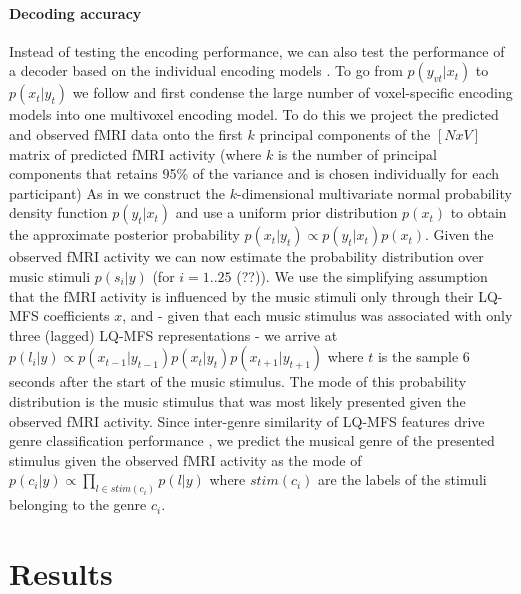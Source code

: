 \paragraph{Decoding accuracy}

Instead of testing the encoding performance, we can also test the performance of
a decoder based on the individual encoding models \cite{NG11}. To go from
$p(y_{vt}|x_{t})$ to $p(x_{t}|y_{t})$ we follow \cite{NG09} and first condense
the large number of voxel-specific encoding models into one multivoxel encoding model.
To do this we project the predicted and observed f{MRI} data onto the first $k$ principal components of the $[N x V]$ matrix of predicted f{MRI} activity  (where $k$ is the number of principal components that retains 95\% of the variance and is chosen individually for each participant) 
As in \cite{NG09} we construct the $k$-dimensional multivariate normal
probability density function $p(y_{t}|x_{t})$ and use a uniform prior
distribution $p(x_{t})$ to obtain the approximate posterior probability
$p(x_{t}|y_{t}) \propto p(y_{t}|x_{t})p(x_{t})$. Given the observed f{MRI}
activity we can now estimate the probability distribution over music stimuli
$p(s_{i}|y)$ (for $i=1..25$ (??)). We use the simplifying assumption that the
f{MRI} activity is influenced by the music stimuli only through their LQ-MFS
coefficients $x$, and - given that each music stimulus was associated with only
three (lagged) LQ-MFS representations - we arrive at $p(l_{i}|y) \propto
p(x_{t-1}|y_{t-1})p(x_{t}|y_{t})p(x_{t+1}|y_{t+1})$ where $t$ is the sample 6
seconds after the start of the music stimulus. The mode of this probability
distribution is the music stimulus that was most likely presented given the
observed f{MRI} activity. Since inter-genre similarity of LQ-MFS features drive
genre classification performance \cite{CTK+2012}, we predict the musical genre
of the presented stimulus given the observed f{MRI} activity as the mode of $p(c_{i}|y)
\propto \prod\nolimits_{l \in stim(c_{i})} p(l|y)$ where $stim(c_{i})$ are
the labels of the stimuli belonging to the genre $c_{i}$. 

\section*{Results}

